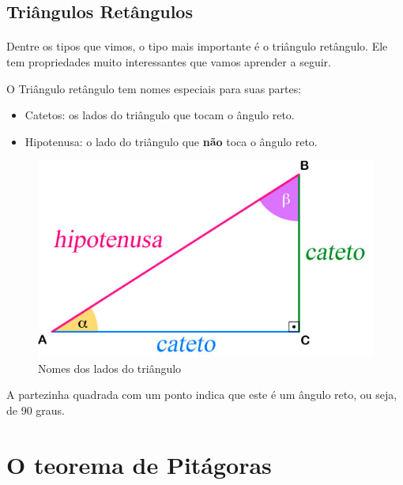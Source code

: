 \documentclass[11pt]{article}
\begin{document}
\subsection{Triângulos Retângulos}
\paragraph{}
Dentre os tipos que vimos, o tipo mais importante é o triângulo retângulo. 
Ele tem propriedades muito interessantes que vamos aprender a seguir.
\par
O Triângulo retângulo tem nomes especiais para suas partes:
\begin{itemize}
	\item Catetos: os lados do triângulo que tocam o ângulo reto.
	\item Hipotenusa: o lado do triângulo que \textbf{não} toca o ângulo reto.
\end{itemize}
\begin{figure}[H]
	\centering
	\includegraphics[width=0.5\linewidth]{imgs/lados.jpg}
	\caption{Nomes dos lados do triângulo}
\end{figure}
A partezinha quadrada com um ponto indica que este é um ângulo reto, ou seja,
de 90 graus.

\section{O teorema de Pitágoras}
\end{document}

